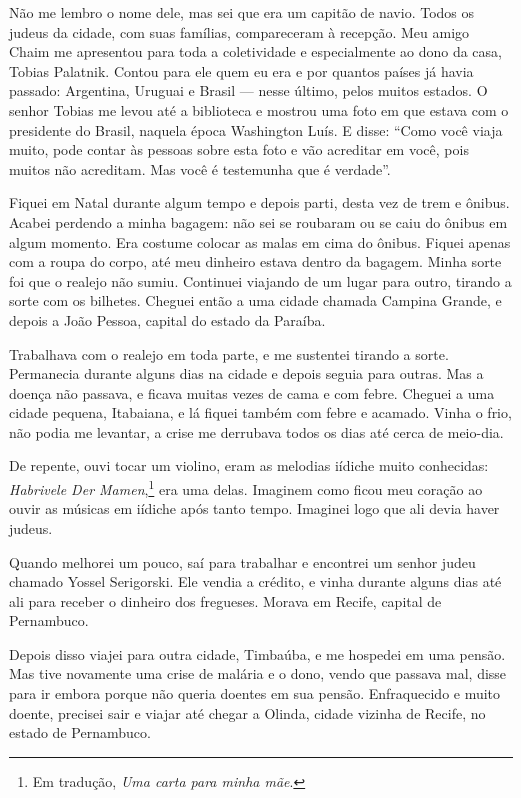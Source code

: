 Não me lembro o nome dele, mas sei que era um capitão de navio. Todos os judeus da cidade, com suas famílias, compareceram à recepção. Meu amigo Chaim me apresentou para toda a coletividade e especialmente ao dono da casa, Tobias Palatnik. Contou para ele quem eu era e por quantos países já havia passado: Argentina, Uruguai e Brasil --- nesse último, pelos muitos estados. O senhor Tobias me levou até a biblioteca e mostrou uma foto em que estava com o presidente do Brasil, naquela época Washington Luís. E disse: ``Como você viaja muito, pode contar às pessoas sobre esta foto e vão acreditar em você, pois muitos não acreditam. Mas você é testemunha que é verdade''.

Fiquei em Natal durante algum tempo e depois parti, desta vez de
trem e ônibus. Acabei perdendo a minha bagagem: não sei se roubaram ou
se caiu do ônibus em algum momento. Era costume colocar as malas
em cima do ônibus. Fiquei apenas com a roupa do corpo, até meu 
dinheiro estava dentro da bagagem. Minha sorte foi
que o realejo não sumiu. Continuei viajando de um lugar para outro,
tirando a sorte com os bilhetes. Cheguei então a uma cidade chamada
Campina Grande, e depois a João Pessoa, capital do estado da Paraíba.

Trabalhava com o realejo em toda parte, e me sustentei tirando a sorte. Permanecia 
durante alguns dias na cidade e depois seguia para outras. Mas a doença não passava, e ficava muitas vezes de cama e com febre. Cheguei a uma cidade pequena, Itabaiana, e lá fiquei também com febre e
acamado. Vinha o frio, não podia me levantar, a crise me derrubava todos os dias até cerca de meio-dia. 

De repente, ouvi tocar um violino, eram
as melodias iídiche muito conhecidas: \textit{Habrivele Der Mamen},\footnote{Em tradução, \textit{Uma carta para minha mãe}.} era uma delas. Imaginem como ficou meu coração ao ouvir as músicas em iídiche após tanto tempo. Imaginei logo que ali devia haver judeus.

Quando melhorei um pouco, saí para trabalhar e encontrei um senhor judeu
chamado Yossel Serigorski. Ele vendia a crédito, e vinha durante alguns
dias até ali para receber o dinheiro dos fregueses. Morava em Recife, capital de Pernambuco.

Depois disso viajei para outra cidade, Timbaúba, e me hospedei em
uma pensão. Mas tive novamente uma crise de malária e o dono, vendo que passava mal, disse para ir embora porque não queria doentes
em sua pensão. Enfraquecido e muito doente, precisei sair e viajar até
chegar a Olinda, cidade vizinha de Recife, no estado de Pernambuco.

